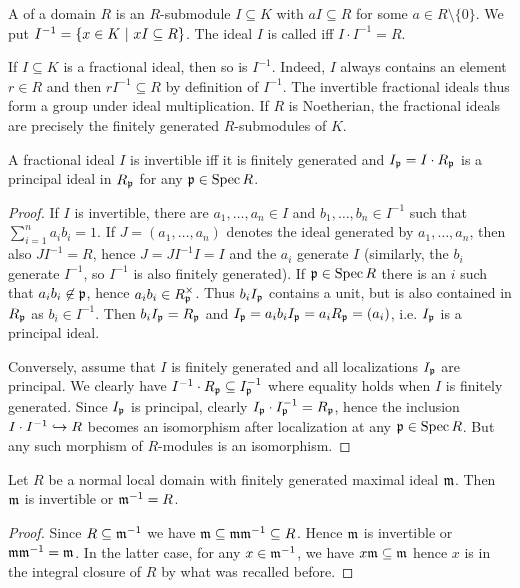 \documentclass[a4paper,parskip=half,numbers=enddot, DIV=12]{scrreprt}
\begin{document}
\begin{defi}  %
    A  of a domain $R$ is an $R$-submodule $I\subseteq K$ with $a I \subseteq R$ for some $a\in R\setminus \{0\}$. We put $I^{-1} = \left\{x\in K\ \middle|\  xI\subseteq R\right\}$. The ideal $I$ is called  iff $I\cdot I^{-1}  = R$. 
\end{defi}
If $I\subseteq K$ is a fractional ideal, then so is $I^{-1}$. Indeed, $I$ always contains an element $r\in R$ and then $rI^{-1}\subseteq R$ by definition of $I^{-1}$. The invertible fractional ideals thus form a group under ideal multiplication. If $R$ is Noetherian, the fractional ideals are precisely the finitely generated $R$-submodules of $K$.
\begin{prop}
    A fractional ideal $I$ is invertible iff it is finitely generated and $I_{\mathfrak{p}}=I\cdot R_{\mathfrak{p}}$ is a principal ideal in $R_{\mathfrak{p}}$ for any $\mathfrak{p}\in \operatorname{Spec} R$.
\end{prop}
\begin{proof}
    If $I$ is invertible, there are $a_1,\ldots,a_n\in I$ and $b_1,\ldots,b_n\in I^{-1}$ such that $\sum_{i=1}^n a_i b_i = 1$. If $J=(a_1,\ldots,a_n)$ denotes the ideal generated by $a_1,\ldots,a_n$, then also $JI^{-1}=R$, hence $J=JI^{-1}I=I$ and the $a_i$ generate $I$ (similarly, the $b_i$ generate $I^{-1}$, so $I^{-1}$ is also finitely generated). If $\mathfrak{p}\in \operatorname{Spec} R$ there is an $i$ such that $a_ib_i\not\in  \mathfrak{p}$, hence $a_ib_i\in R_{\mathfrak{p}}^\times$. Thus $b_iI_{\mathfrak{p}}$ contains a unit, but is also contained in $R_{\mathfrak{p}}$ as $b_i\in I^{-1}$. Then $b_iI_{\mathfrak{p}}=R_{\mathfrak{p}}$ and $I_{\mathfrak{p}}=a_ib_iI_{\mathfrak{p}}=a_iR_{\mathfrak{p}}=(a_i)$, i.e. $I_{\mathfrak{p}}$ is a principal ideal.
    
    Conversely, assume that $I$ is finitely generated and all localizations $I_{\mathfrak{p}}$ are principal. We clearly have $I^{-1}\cdot R_{\mathfrak{p}}\subseteq I_{\mathfrak{p}}^{-1}$ where equality holds when $I$ is finitely generated. Since $I_{\mathfrak{p}}$ is principal, clearly $I_{\mathfrak{p}}\cdot I_{\mathfrak{p}}^{-1} = R_{\mathfrak{p}}$, hence the inclusion $I\cdot I^{-1}\monomorphism R$ becomes an isomorphism after localization at any $\mathfrak{p}\in \operatorname{Spec} R$. But any such morphism of $R$-modules is an isomorphism.
\end{proof}
\begin{lem}
    Let $R$ be a normal local domain with finitely generated maximal ideal $\mathfrak{m}$. Then $\mathfrak{m}$ is invertible or $\mathfrak{m}^{-1} = R$.
\end{lem}
\begin{proof}
    Since $R\subseteq \mathfrak{m}^{-1}$ we have $\mathfrak{m}\subseteq \mathfrak{m} \mathfrak{m}^{-1} \subseteq R$. Hence $\mathfrak{m}$ is invertible or $\mathfrak{m}\mathfrak{m}^{-1} = \mathfrak{m}$. In the latter case, for any $x\in \mathfrak{m}^{-1}$, we have $x\mathfrak{m} \subseteq \mathfrak{m}$ hence $x$ is in the integral closure of $R$ by what was recalled before.
\end{proof}
\end{document}
